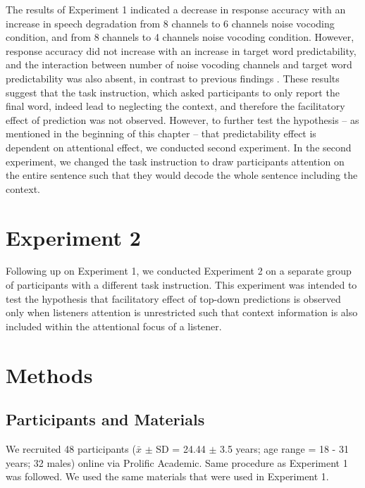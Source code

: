 \documentclass[a4paper, nobind]{templates/ociamthesis}
\begin{document}
The results of Experiment 1 indicated a decrease in response accuracy with an increase in speech degradation from 8 channels to 6 channels noise vocoding condition, and from 8 channels to 4 channels noise vocoding condition.
However, response accuracy did not increase with an increase in target word predictability,
and the interaction between number of noise vocoding channels and target word predictability was also absent, in contrast to previous findings \autocites{Obleser2007,Obleser2011}[see also][]{Hunter2018}.
These results suggest that the task instruction, which asked participants to only report the final word, indeed lead to neglecting the context, and therefore the facilitatory effect of prediction was not observed.
However, to further test the hypothesis -- as mentioned in the beginning of this chapter -- that predictability effect is dependent on attentional effect, we conducted second experiment.
In the second experiment, we changed the task instruction to draw participants attention on the entire sentence such that they would decode the whole sentence including the context.

\hypertarget{experiment-2}{%
\section{Experiment 2}\label{experiment-2}}

Following up on Experiment 1, we conducted Experiment 2 on a separate group of participants with a different task instruction.
This experiment was intended to test the hypothesis that facilitatory effect of top-down predictions is observed only when listeners attention is unrestricted such that context information is also included within the attentional focus of a listener.

\hypertarget{methods-1}{%
\section{Methods}\label{methods-1}}

\hypertarget{participants-and-materials}{%
\subsection{Participants and Materials}\label{participants-and-materials}}

We recruited 48 participants (\(\bar{x}\) \(\pm\) SD = 24.44 \(\pm\) 3.5 years; age range = 18 - 31 years; 32 males) online via Prolific Academic.
Same procedure as Experiment 1 was followed.
We used the same materials that were used in Experiment 1.
\end{document}
